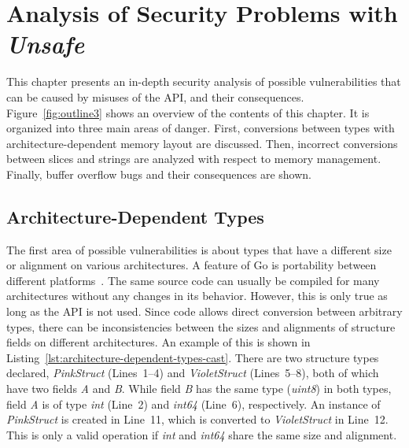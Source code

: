 
\chapter{Analysis of Security Problems with \textit{Unsafe}}\label{ch:unsafe-security-problems}

This chapter presents an in-depth security analysis of possible vulnerabilities that can be caused by misuses of the
\unsafe{} \acrshort{API}, and their consequences.
Figure~\ref{fig:outline3} shows an overview of the contents of this chapter.
It is organized into three main areas of danger.
First, conversions between types with architecture-dependent memory layout are discussed.
Then, incorrect conversions between slices and strings are analyzed with respect to memory management.
Finally, buffer overflow bugs and their consequences are shown.





\section{Architecture-Dependent Types}\label{sec:unsafe-security-problems:architecture-dependent-types}

The first area of possible vulnerabilities is about types that have a different size or alignment on various
architectures.
A feature of Go is portability between different platforms~\cite{brimzhanova2019}.
The same source code can usually be compiled for many architectures without any changes in its behavior.
However, this is only true as long as the \unsafe{} \acrshort{API} is not used.
Since \unsafe{} code allows direct conversion between arbitrary types, there can be inconsistencies between the sizes
and alignments of structure fields on different architectures.
An example of this is shown in Listing~\ref{lst:architecture-dependent-types-cast}.
There are two structure types declared, \textit{PinkStruct} (Lines~1--4) and \textit{VioletStruct} (Lines~5--8), both of
which have two fields \textit{A} and \textit{B}.
While field \textit{B} has the same type (\textit{uint8}) in both types, field \textit{A} is of type \textit{int}
(Line~2) and \textit{int64} (Line~6), respectively.
An instance of \textit{PinkStruct} is created in Line~11, which is converted to \textit{VioletStruct} in Line~12.
This is only a valid operation if \textit{int} and \textit{int64} share the same size and alignment.

